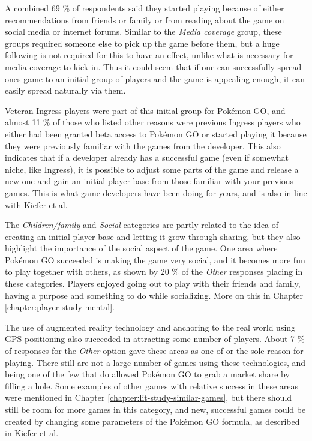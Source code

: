 A combined 69 \% of respondents said they started playing because of either recommendations from friends or family or from reading about the game on social media or internet forums. Similar to the \emph{Media coverage} group, these groups required someone else to pick up the game before them, but a huge following is not required for this to have an effect, unlike what is necessary for media coverage to kick in. Thus it could seem that if one can successfully spread ones game to an initial group of players and the game is appealing enough, it can easily spread naturally via them.

Veteran Ingress players were part of this initial group for Pokémon GO, and almost 11 \% of those who listed other reasons were previous Ingress players who either had been granted beta access to Pokémon GO or started playing it because they were previously familiar with the games from the developer. This also indicates that if a developer already has a successful game (even if somewhat niche, like Ingress), it is possible to adjust some parts of the game and release a new one and gain an initial player base from those familiar with your previous games. This is what game developers have been doing for years, and is also in line with Kiefer et al.\cite{kiefer2006systematically}

The \emph{Children/family} and \emph{Social} categories are partly related to the idea of creating an initial player base and letting it grow through sharing, but they also highlight the importance of the social aspect of the game. One area where Pokémon GO succeeded is making the game very social, and it becomes more fun to play together with others, as shown by 20 \% of the \emph{Other} responses placing in these categories. Players enjoyed going out to play with their friends and family, having a purpose and something to do while socializing. More on this in Chapter \ref{chapter:player-study-mental}.

The use of augmented reality technology and anchoring to the real world using GPS positioning also succeeded in attracting some number of players. About 7 \% of responses for the \emph{Other} option gave these areas as one of or the sole reason for playing. There still are not a large number of games using these technologies, and being one of the few that do allowed Pokémon GO to grab a market share by filling a hole. Some examples of other games with relative success in these areas were mentioned in Chapter \ref{chapter:lit-study-similar-games}, but there should still be room for more games in this category, and new, successful games could be created by changing some parameters of the Pokémon GO formula, as described in Kiefer et al.\cite{kiefer2006systematically}

